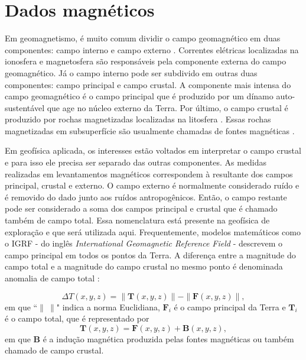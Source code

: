 \chapter{Dados magnéticos}

Em geomagnetismo, é muito comum dividir o campo geomagnético em duas componentes: campo interno e campo externo \citep{treatise2007}. Correntes elétricas localizadas na ionosfera e magnetosfera são responsáveis pela componente externa do campo geomagnético. Já o campo interno pode ser subdivido em outras duas componentes: campo principal e campo crustal. A componente mais intensa do campo geomagnético é o campo principal que é produzido por um dínamo auto-sustentável que age no núcleo externo da Terra. Por último, o campo crustal é produzido por rochas magnetizadas localizadas na litosfera \citep{langel-hinze1998, treatise2007}. Essas rochas magnetizadas em subsuperfície são usualmente chamadas de fontes magnéticas \citep{blakely1996, nabighian-etal2005-mag}.

Em geofísica aplicada, os interesses estão voltados em interpretar o campo crustal e para isso ele precisa ser separado das outras componentes. As medidas realizadas em levantamentos magnéticos correspondem à resultante dos campos principal, crustal e externo. O campo externo é normalmente considerado ruído e é removido do dado junto aos ruídos antropogênicos. Então, o campo restante pode ser considerado a soma dos campos principal e crustal \citep{treatise2007} que é chamado também de campo total\citep{blakely1996}. Essa nomenclatura está presente na geofísica de exploração e que será utilizada aqui. Frequentemente, modelos matemáticos como o IGRF - do inglês \textit{International Geomagnetic Reference Field} - descrevem o campo principal em todos os pontos da Terra. A diferença entre a magnitude do campo total e a magnitude do campo crustal no mesmo ponto é denominada anomalia de campo total \citep{blakely1996, nabighian-etal2005-mag}:

\begin{equation}\label{eq:anomtotal}
\Delta T(x, y, z) = \|\mathbf{T}(x, y, z)\| - \| \mathbf{F}(x, y, z)\|,
\end{equation}
em que ``$\| \: \|$" indica a norma Euclidiana, $\mathbf{F}_i$ é o campo principal da Terra e $\mathbf{T}_i$ é o campo total, que é representado por
\begin{equation}\label{eq:camptotal}
\mathbf{T}(x, y, z) = \mathbf{F}(x, y, z) + \mathbf{B}(x, y, z) ,
\end{equation}
em que $\mathbf{B}$ é a indução magnética produzida pelas fontes magnéticas ou também chamado de campo crustal.

